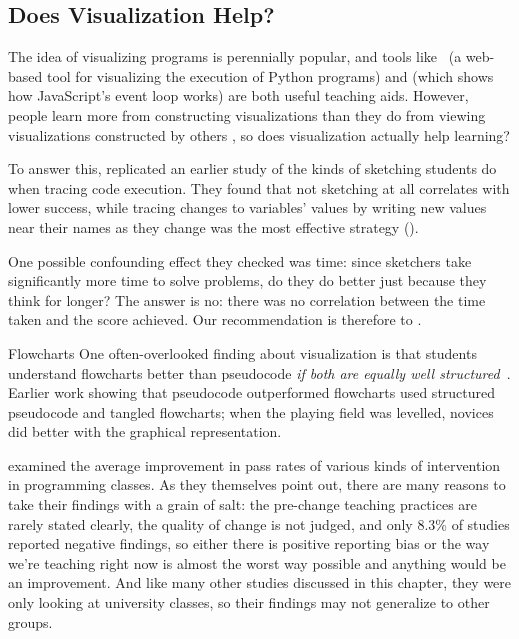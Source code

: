 \subsection*{Does Visualization Help?}

The idea of visualizing programs is perennially popular, and tools like~\cite{Guo2013} (a web-based tool for visualizing the execution of Python programs) and  (which shows how JavaScript's event loop works) are both useful teaching aids. However, people learn more from constructing visualizations than they do from viewing visualizations constructed by others \cite{Stas1998,Ceti2016}, so does visualization actually help learning?

To answer this, \cite{Cunn2017} replicated an earlier study of the kinds of sketching students do when tracing code execution. They found that not sketching at all correlates with lower success, while tracing changes to variables' values by writing new values near their names as they change was the most effective strategy ().

One possible confounding effect they checked was time: since sketchers take significantly more time to solve problems, do they do better just because they think for longer? The answer is no: there was no correlation between the time taken and the score achieved. Our recommendation is therefore to .

\begin{aside}{Flowcharts}
  One often-overlooked finding about visualization is that students understand flowcharts better than pseudocode \emph{if both are equally well structured}~\cite{Scan1989}. Earlier work showing that pseudocode outperformed flowcharts used structured pseudocode and tangled flowcharts; when the playing field was levelled, novices did better with the graphical representation.
\end{aside}


\cite{Viha2014} examined the average improvement in pass rates of various kinds of intervention in programming classes. As they themselves point out, there are many reasons to take their findings with a grain of salt: the pre-change teaching practices are rarely stated clearly, the quality of change is not judged, and only 8.3\% of studies reported negative findings, so either there is positive reporting bias or the way we're teaching right now is almost the worst way possible and anything would be an improvement. And like many other studies discussed in this chapter, they were only looking at university classes, so their findings may not generalize to other groups.

